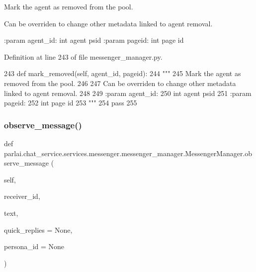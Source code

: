 \begin{DoxyVerb}Mark the agent as removed from the pool.

Can be overriden to change other metadata linked to agent removal.

:param agent_id:
    int agent psid
:param pageid:
    int page id
\end{DoxyVerb}
 

Definition at line 243 of file messenger\+\_\+manager.\+py.


\begin{DoxyCode}
243     \textcolor{keyword}{def }mark\_removed(self, agent\_id, pageid):
244         \textcolor{stringliteral}{"""}
245 \textcolor{stringliteral}{        Mark the agent as removed from the pool.}
246 \textcolor{stringliteral}{}
247 \textcolor{stringliteral}{        Can be overriden to change other metadata linked to agent removal.}
248 \textcolor{stringliteral}{}
249 \textcolor{stringliteral}{        :param agent\_id:}
250 \textcolor{stringliteral}{            int agent psid}
251 \textcolor{stringliteral}{        :param pageid:}
252 \textcolor{stringliteral}{            int page id}
253 \textcolor{stringliteral}{        """}
254         \textcolor{keywordflow}{pass}
255 
\end{DoxyCode}
\mbox{\label{classparlai_1_1chat__service_1_1services_1_1messenger_1_1messenger__manager_1_1MessengerManager_ab951bfae1eeb05f42e9fa215b2d019a7}} 
\subsubsection{\texorpdfstring{observe\+\_\+message()}{observe\_message()}}
{\footnotesize\ttfamily def parlai.\+chat\+\_\+service.\+services.\+messenger.\+messenger\+\_\+manager.\+Messenger\+Manager.\+observe\+\_\+message (\begin{DoxyParamCaption}\item[{}]{self,  }\item[{}]{receiver\+\_\+id,  }\item[{}]{text,  }\item[{}]{quick\+\_\+replies = {\ttfamily None},  }\item[{}]{persona\+\_\+id = {\ttfamily None} }\end{DoxyParamCaption})}

